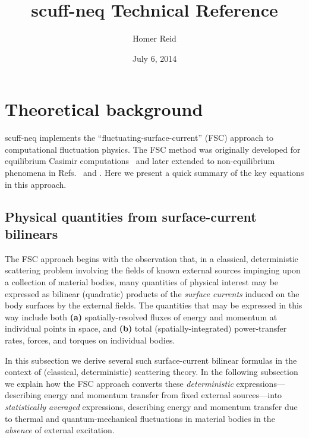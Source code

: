 \documentclass[letterpaper]{article}
\title {{\sc scuff-neq} Technical Reference}
\author {Homer Reid}
\date {July 6, 2014}
\begin{document}
\pagestyle{myheadings}
\maketitle

\tableofcontents

\newpage
\section{Theoretical background}

{\sc scuff-neq} implements the ``fluctuating-surface-current''
(FSC) approach to computational fluctuation physics. The 
FSC method was originally developed for equilibrium Casimir
computations~\cite{Reid2009, Reid2011, Reid2013B} and later
extended to non-equilibrium phenomena in 
Refs.~ and .
Here we present a quick summary of the key equations in this
approach.

\subsection{Physical quantities from surface-current bilinears}
\label{PQsFromSCBsSection}

The FSC approach begins with the observation that, in a 
classical, deterministic scattering problem involving the 
fields of known external sources impinging upon a collection
of material bodies, many quantities of physical interest 
may be expressed as bilinear (quadratic) products of the 
\textit{surface currents} induced on the body surfaces by 
the external fields. The quantities that may be expressed
in this way include both \textbf{(a)} spatially-resolved 
fluxes of energy and momentum at individual points in space,
and \textbf{(b)} total (spatially-integrated) power-transfer 
rates, forces, and torques on individual bodies.

In this subsection we derive several such surface-current 
bilinear formulas in the context of (classical, deterministic)
scattering theory. In the following subsection we explain how 
the FSC approach converts these \textit{deterministic} 
expressions---describing energy and momentum transfer
from fixed external sources---into \textit{statistically averaged} 
expressions, describing energy and momentum transfer
due to thermal and quantum-mechanical fluctuations
in material bodies in the \textit{absence} of external
excitation.
\end{document}
